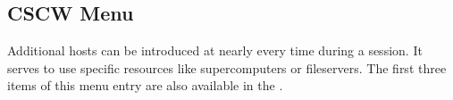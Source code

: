 	 \subsection{CSCW Menu}
	 \label{cscw}
         
	 
	 Additional hosts can be introduced at nearly every time during a {\covise} 
	 session. It serves to use specific resources like supercomputers or fileservers. 
    The first three items of this menu entry are also available in the {\mytoolbar}.




